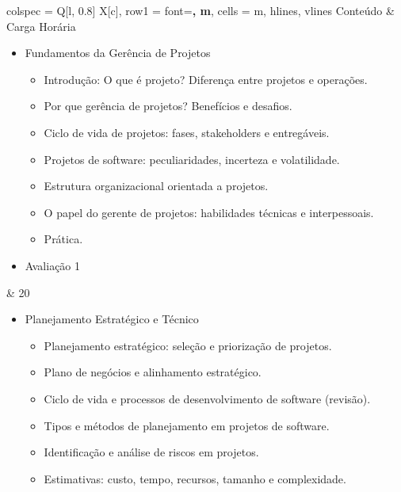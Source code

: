 \documentclass[a4paper, 12pt]{article}
\begin{document}
\begin{longtblr}{colspec = {Q[l, 0.8\textwidth] X[c]},
        row{1} = {font=\bfseries, m},
        cells = {m},
        hlines, vlines
        }
    Conteúdo & Carga Horária\\
    \begin{itemize}
        \item Fundamentos da Gerência de Projetos
            \begin{itemize}
                \item Introdução: O que é projeto? Diferença entre projetos e operações.
                \item Por que gerência de projetos? Benefícios e desafios.
                \item Ciclo de vida de projetos: fases, stakeholders e entregáveis.
                \item Projetos de software: peculiaridades, incerteza e volatilidade.
                \item Estrutura organizacional orientada a projetos.
                \item O papel do gerente de projetos: habilidades técnicas e interpessoais.
                \item Prática.
            \end{itemize}
        \item Avaliação 1
    \end{itemize} & 20\\
    \begin{itemize}
        \item Planejamento Estratégico e Técnico
            \begin{itemize}
                \item Planejamento estratégico: seleção e priorização de projetos.
                \item Plano de negócios e alinhamento estratégico.
                \item Ciclo de vida e processos de desenvolvimento de software (revisão).
                \item Tipos e métodos de planejamento em projetos de software.
                \item Identificação e análise de riscos em projetos.
                \item Estimativas: custo, tempo, recursos, tamanho e complexidade.

\end{itemize}
\end{itemize}
\end{longtblr}
\end{document}
